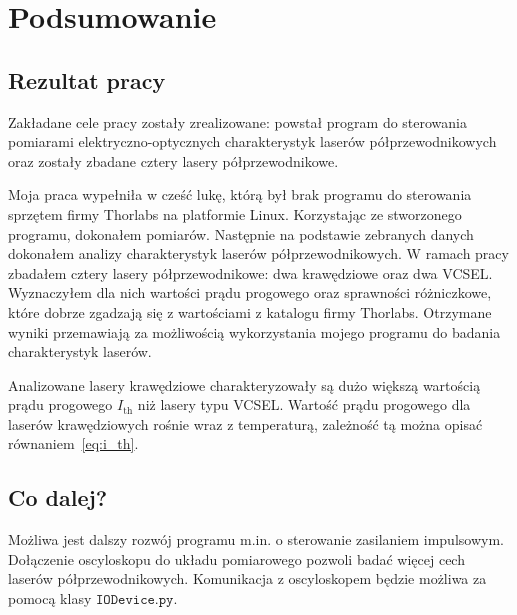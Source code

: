 \chapter{Podsumowanie}
\section{Rezultat pracy}
Zakładane cele pracy zostały zrealizowane: powstał program do sterowania pomiarami elektryczno-optycznych charakterystyk laserów półprzewodnikowych
oraz zostały zbadane cztery lasery półprzewodnikowe.

Moja praca wypełniła w cześć lukę, którą był brak programu do sterowania sprzętem firmy Thorlabs
na platformie Linux.
Korzystając ze stworzonego programu, dokonałem pomiarów. Następnie na podstawie zebranych danych dokonałem analizy charakterystyk laserów półprzewodnikowych.
W ramach pracy zbadałem cztery lasery półprzewodnikowe: dwa krawędziowe oraz dwa VCSEL. Wyznaczyłem dla nich
wartości prądu progowego oraz sprawności różniczkowe, które dobrze zgadzają się z wartościami z katalogu firmy Thorlabs. Otrzymane wyniki
przemawiają za możliwością wykorzystania mojego programu do badania charakterystyk laserów.

Analizowane lasery krawędziowe charakteryzowały są dużo większą wartością prądu progowego $I_{\mathrm{th}}$ niż lasery typu VCSEL.
Wartość prądu progowego dla laserów krawędziowych rośnie wraz z temperaturą, zależność tą można opisać równaniem~\ref{eq:i_th}.


\section{Co dalej?}
Możliwa jest dalszy rozwój programu m.in. o sterowanie zasilaniem impulsowym. Dołączenie oscyloskopu do układu pomiarowego pozwoli badać więcej cech
laserów półprzewodnikowych. Komunikacja z oscyloskopem będzie możliwa za pomocą klasy $\mathtt{IODevice.py}$.
